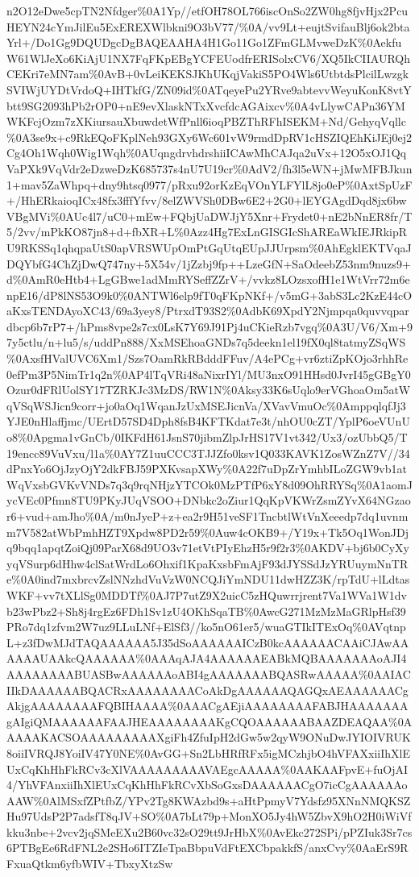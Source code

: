\documentclass[]{article}
\begin{document}
n2O12eDwe5cpTN2Nfdger\%0A1Yp//etfOH78OL766iscOnSo2ZW0hg8fjvHjx2PcuHEYN24cYmJilEu5ExEREXWlbkni9O3bV77/\%0A/vv9Lt+eujtSvifauBlj6ok2btaYrl+/Do1Gg9DQUDgcDgBAQEAAHA4H1Go11Go1ZFmGLMvweDzK\%0AekfuW61WlJeXo6KiAjU1NX7FqFKpEBgYCFEUodfrERISolxCV6/XQ5IkCIIAURQhCEKri7eMN7am\%0AvB+0vLeiKEKSJKhUKqjVakiS5PO4Wls6UtbtdsPlcilLwzgkSVIWjUYDtVrdoQ+IHTkfG/ZN09id\%0ATqeyePu2YRve9abtevvWeyuKonK8vtYbtt9SG2093hPb2rOP0+nE9evXlaskNTxXvcfdcAGAixcv\%0A4vLlywCAPn36YMWKFcjOzm7zXKiursauXbuwdetWfPnll6ioqPBZThRFhISEKM+Nd/GehyqVqllc\%0A3se9x+c9RkEQoFKplNeh93GXy6Wc601vW9rmdDpRV1cHSZIQEhKiJEj0ej2Cg4Oh1Wqh0Wig1Wqh\%0AUqngdrvhdrshiiICAwMhCAJqa2uVx+12O5xOJ1QqVaPXk9VqVdr2eDzweDzK685737s4nU7U19cr\%0AdV2/fh3l5eWN+jMwMFBJkun1+mav5ZaWhpq+dny9htsq0977/pRxu92orKzEqVOnYLFYlL8jo0eP\%0AxtSpUzF+/HhERkaioqICx48fx3fffYfvv/8elZWVSh0DBw6E2+2G0+lEYGAgdDqd8jx6bwVBgMVi\%0AUc4l7/uC0+mEw+FQbjUaDWJjY5Xnr+Frydet0+nE2bNnER8fr/T5/2vv/mPkKO87jn8+d+fbXR+L\%0Azz4Hg7ExLnGISGIcShAREaWkIEJRkipRU9RKSSq1qhqpaUtS0apVRSWUpOmPtGqUtqEUpJJUrpsm\%0AhEgklEKTVqaJDQYbfG4ChZjDwQ747ny+5X54v/1jZzbj9fp++LzeGfN+SaOdeebZ53nm9nuzs9+d\%0AmR0eHtb4+LgGBwe1adMmRYSeffZZrV+/vvkz8LOzsxofH1e1WtVrr72m6enpE16/dP8lNS53O9k0\%0ANTWl6elp9fT0qFKpNKf+/v5mG+3abS3Lc2KzE44cOaKxsTENDAyoXC43/69a3yey8/PtrxdT93S2\%0AdbK69XpdY2Njmpqa0quvvqpardbcp6b7rP7+/hPms8vpe2s7cx0LsK7Y69J91Pj4uCKieRzb7vgq\%0A3U/V6/Xm+97y5ctlu/n+lu5/s/uddPn888/XxMSEhoaGNDs7q5deekn1el19fX0ql8tatmyZSqWS\%0AxsfHValUVC6Xm1/Szs7OamRkRBdddFFuv/A4ePCg+vr6ztiZpKOjo3rhhRe0efPm3P5NimTr1q2n\%0AP4lTqVRi48aNixrIYl/MU3nxO91HHsd0JvrI45gGBgY0Ozur0dFRlUolSY17TZRKJc3MzDS/RW1N\%0Aksy33K6sUqlo9erVGhoaOm5atWqVSqWSJicn9corr+jo0aOq1WqanJzUxMSEJicnVa/XVavVmuOc\%0AmppqlqfJj3YJE0nHlaffjmc/UErtD57SD4Dph8fsB4KFTKdat7e3t/nhOU0cZT/YplP6oeVUnUo8\%0Apgma1vGnCb/0IKFdH61JsnS70jibmZlpJrHS17V1vt342/Ux3/ozUbbQ5/T19encc89VuVxu/l1a\%0AY7Z1uuCCC3TJJZfo0ksv1Q033KAVK1ZosWZnZ7V//34dPnxYo6OjJzyOjY2dkFBJ59PXKvsapXWy\%0A22f7uDpZrYmhbILoZGW9vb1atWqVxsbGVKvVNDs7q3q9rqNHjzYTCOk0MzPTfP6xY8d09OhRRYSq\%0A1aomJycVEc0Pfmn8TU9PKyJUqVSOO+DNbkc2oZiur1QqKpVKWrZsmZYvX64NGzaor6+vud+amJho\%0A/m0nJyeP+z+ea2r9H51veSF1TncbtlWtVnXeeedp7dq1uvnmm7V582atWbPmhHZT9Xpdw8PD2r59\%0Auw4cOKB9+/Y19x+Tk5Oq1WonJDjq9bqq1apqtZoiQj09ParX68d9UO3v71etVtPIyEhzH5r9f2r3\%0AKDV+bj6b0CyXyyqVSurp6dHhw4clSatWrdLo6Ohxif1KpaKxsbFmAjF93dJYSSdJzYRUuymNnTRe\%0A0ind7mxbrcvZslNNzhdVuVzW0NCQJiYmNDU11dwHZZ3K/rpTdU+lLdtasWKF+vv7tXLlSg0MDDTf\%0AJ7P7utZ9X2uicC5zHQuwrrjrent7Va1WVa1W1dvb23wPbz2+Sh8j4rgEz6FDh1Sv1zU4OKhSqaTB\%0AwcG271MzMzMaGRlpHsf39PRo7dq1zfvm2W7uz9LLuLNf+ElSf3//ko5nO61er5/wuaGTIkITExOq\%0AVqtnpL+z3fDwMJdTAQAAAAAA5J35dSoAAAAAAICzB0kcAAAAAACAAiCJAwAAAAAAUAAkcQAAAAAA\%0AAAqAJA4AAAAAAEABkMQBAAAAAAAoAJI4AAAAAAAABUASBwAAAAAAoABI4gAAAAAAABQASRwAAAAA\%0AAIACIIkDAAAAAABQACRxAAAAAAAACoAkDgAAAAAAQAGQxAEAAAAAACgAkjgAAAAAAAAFQBIHAAAA\%0AAACgAEjiAAAAAAAAFABJHAAAAAAAgAIgiQMAAAAAAFAAJHEAAAAAAAAKgCQOAAAAAABAAZDEAQAA\%0AAAAAKACSOAAAAAAAAAXgiFh4ZfuIpH2dGw5w2qyW9ONuDwJYIOIVRUK8oiiIVRQJ8YoiIV47Y0NE\%0AvGG+Sn2LbHRfRFx5igMCzhjbO4hVFAXxiiIhXlEUxCqKhHhFkRCv3cXlVAAAAAAAAAVAEgcAAAAA\%0AAKAAFpvE+fuOjAI4/YhVFAnxiiIhXlEUxCqKhHhFkRCvXbSoGxsDAAAAAACgO7icCgAAAAAAoAAW\%0AlMSxfZPtfbZ/YPv2Tg8KWAzbd9s+aHtPpmyV7Ydsfz95XNnNMQKSZHu97UdsP2P7adsfT8qJV+SO\%0A7bLt79p+MonXO5Jy4hW5ZbvX9hO2H0iWiVfkku3nbe+2vcv2jqSMeEXu2B60vc32sO29tt9JrHbX\%0AvEkc272SPi/pPZIuk3Sr7cs6PTBgEe6RdFNL2e2SHo6ITZIeTpaBbpuVdFtEXCbpakkfS/anxCvy\%0AaErS9RFxuaQtkm6yfbWIV+TbxyXtzSw
\end{document}
